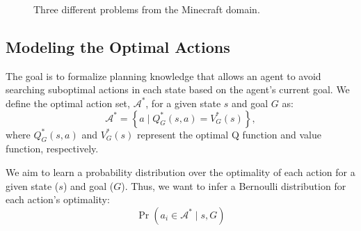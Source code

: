 \documentclass[11pt]{article}
\begin{document}
\begin{figure}[t]
\centering
{}
  \caption{Three different problems from the Minecraft domain.}
  \label{fig:minecraft}
\end{figure}


\subsection{Modeling the Optimal Actions}

The goal is to formalize planning knowledge that allows an agent to
avoid searching suboptimal actions in each state based on the agent's
current goal. We define the optimal action set, $\mathcal{A}^*$, for a
given state $s$ and goal $G$ as:
\begin{equation}
\mathcal{A}^* = \left\{ a \mid Q^*_G(s,a) = V^*_G(s) \right\}, 
\label{eq:opt_act_set}
\end{equation}
where $Q^*_G(s,a)$ and $V^*_G(s)$ represent the optimal Q function and 
value function, respectively.

We aim to learn a probability distribution over the optimality of each action
for a given state ($s$) and goal ($G$). Thus, we want to infer a Bernoulli
distribution for each action's optimality:
\begin{equation}
\Pr(a_i \in \mathcal{A}^* \mid s, G)
\label{eq:master}
\end{equation}
\end{document}
